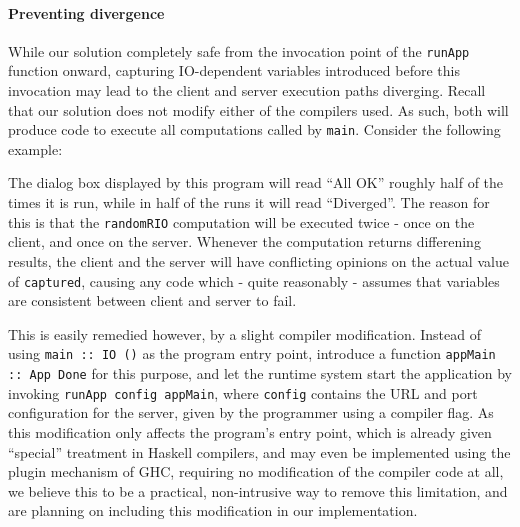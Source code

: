 \documentclass[preprint]{sigplanconf}
\begin{document}
\paragraph{Preventing divergence} While our solution completely safe from the
invocation point of the \lstinline!runApp! function onward, capturing
IO-dependent variables introduced before this invocation may lead to the client
and server execution paths diverging. Recall that our solution does not modify
either of the compilers used. As such, both will produce code to execute all
computations called by \lstinline!main!. Consider the following example:


The dialog box displayed by this program will read ``All OK'' roughly half
of the times it is run, while in half of the runs it will read ``Diverged''.
The reason for this is that the \lstinline!randomRIO! computation will be
executed twice - once on the client, and once on the server. Whenever the
computation returns differening results, the client and the server will have
conflicting opinions on the actual value of \lstinline!captured!, causing any
code which - quite reasonably - assumes that variables are consistent between
client and server to fail.

This is easily remedied however, by a slight compiler modification. Instead of
using \lstinline!main :: IO ()! as the program entry point, introduce a function
\lstinline!appMain :: App Done! for this purpose, and let the runtime system
start the application by invoking \lstinline!runApp config appMain!, where
\lstinline!config! contains the URL and port configuration for the server, given
by the programmer using a compiler flag. As this modification only affects the
program's entry point, which is already given ``special'' treatment in Haskell
compilers, and may even be implemented using the plugin mechanism of GHC,
requiring no modification of the compiler code at all, we believe this to be a
practical, non-intrusive way to remove this limitation, and are planning on
including this modification in our implementation.
\end{document}
